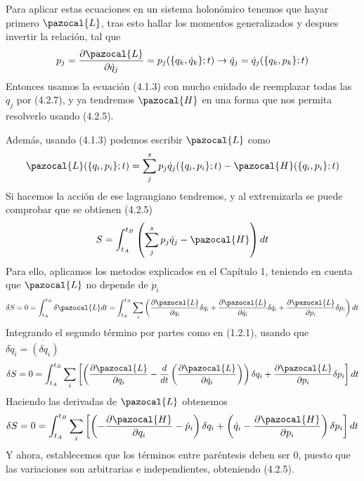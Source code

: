 Para aplicar estas ecuaciones en un sistema holonómico tenemos que hayar primero $\pazocal{L}$, tras esto hallar los momentos generalizados y despues invertir la relación, tal que
\begin{equation} \label{4.2.7}
    p_j = \frac{\partial \pazocal{L}}{\partial \dot{q}_j}=p_j(\{q_k,\dot{q}_k\};t) \rightarrow \dot{q}_j = \dot{q}_j(\{q_k,p_k\};t)
\end{equation} 
Entonces usamos la ecuación (4.1.3) con mucho cuidado de reemplazar todas las $\dot{q}_j$ por (4.2.7), y ya tendremos $\pazocal{H}$ en una forma que nos permita resolverlo usando (4.2.5).

Además, usando (4.1.3) podemos escribir $\pazocal{L}$ como
\begin{equation} \label{4.2.7}
    \pazocal{L}(\{q_i,p_i\};t) = \sum_j^s p_j \dot{q}_j (\{q_i,p_i\};t) -\pazocal{H}(\{q_i,p_i\};t)
\end{equation} 
Si hacemos la acción de ese lagrangiano tendremos, y al extremizarla se puede comprobar que se obtienen (4.2.5)
\begin{equation} \label{4.2.7}
    S = \int_{t_A}^{t_B} \left(\sum_j^s p_j \dot{q}_j -\pazocal{H}\right) dt
\end{equation} 
Para ello, aplicamos los metodos explicados en el Capítulo 1, teniendo en cuenta que $\pazocal{L}$ no depende de $\dot{p}_i$ 
\[
    \delta S = 0 = \int_{t_A}^{t_B} \delta \pazocal{L} dt = \int_{t_A}^{t_B} \sum_i\left(\frac{\partial \pazocal{L}}{\partial q_i} \delta q_i + \frac{\partial \pazocal{L}}{\partial \dot{q}_i} \delta \dot{q}_i + \frac{\partial \pazocal{L}}{\partial p_i} \delta p_i\right) dt
\]
Integrando el segundo término por partes como en (1.2.1), usando que $\delta \dot{q}_i =  \dot{(\delta q_i)}$
\[
    \delta S = 0 = \int_{t_A}^{t_B} \sum_{i}\left[\left(\frac{\partial \pazocal{L}}{\partial q_i} - \frac{d}{dt}\left(\frac{\partial \pazocal{L}}{\partial \dot{q}_i}\right)\right) \delta q_i + \frac{\partial \pazocal{L}}{\partial p_i}\delta p_i\right] dt
\]
Haciendo las derivadas de $\pazocal{L}$ obtenemos
\[
    \delta S = 0 = \int_{t_A}^{t_B} \sum_{i}\left[\left(-\frac{\partial \pazocal{H}}{\partial q_i} - \dot{p}_i\right) \delta q_i + \left(\dot{q}_i-\frac{\partial \pazocal{H}}{\partial p_i}\right)\delta p_i\right] dt
\]
Y ahora, establecemos que los términos entre paréntesis deben ser 0, puesto que las variaciones son arbitrarias e independientes, obteniendo (4.2.5).
\vspace{-20pt}
